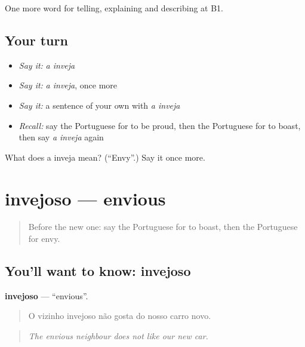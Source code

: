 \begin{grammarlens}[title={What you've built}]
One more word for telling, explaining and describing at B1.
\end{grammarlens}

\subsection*{Your turn}
\begin{itemize}
\raggedright
  \item \emph{Say it:} \emph{a inveja}
  \item \emph{Say it:} \emph{a inveja}, once more
  \item \emph{Say it:} a sentence of your own with \emph{a inveja}
  \item \emph{Recall:} say the Portuguese for to be proud, then the Portuguese for to boast, then say \emph{a inveja} again
\end{itemize}

\begin{tcolorbox}[breakable,colback=teal!4,colframe=teal!35!black,title={Before you move on}]
What does a inveja mean? (\textquotedblleft{}Envy\textquotedblright{}.) Say it once more.
\end{tcolorbox}
\section[invejoso]{invejoso — envious}

\label{lesson:PT-C468-invejoso}



\begin{quote}
Before the new one: say the Portuguese for to boast, then the Portuguese for envy.
\end{quote}

\subsection*{You'll want to know: invejoso}
\textbf{invejoso} — \textquotedblleft{}envious\textquotedblright{}.

\begin{quote}
O vizinho invejoso não gosta do nosso carro novo.
\end{quote}

\begin{quote}
\emph{The envious neighbour does not like our new car.}
\end{quote}


